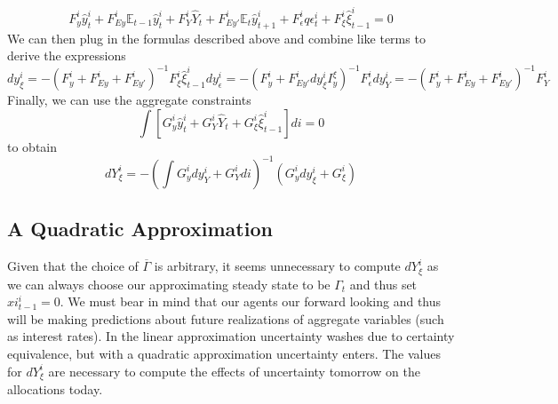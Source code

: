 \documentclass[thmsb,11pt]{article}
\newcommand{\EE}{\mathbb E}
\begin{document}
\[
	F^i_y\hat y^i_t + F^i_{Ey}\EE_{t-1}\hat y^i_{t} + F^i_Y \hat Y_t + F^i_{Ey'} \EE_t\hat y^i_{t+1} + F^i_\epsilon q\epsilon^i_t + F^i_\xi \hat \xi^i_{t-1} = 0
\]We can then plug in the formulas described above and combine like terms to derive the expressions
\begin{subequations}
\begin{equation}
	dy^i_\xi = -(F^i_y + F^i_{Ey} + F^i_{Ey'})^{-1}F^i_\xi \hat\xi^i_{t-1}
\end{equation}
\begin{equation}
	dy^i_\epsilon = -(F^i_y + F^i_{Ey'} dy^i_\xi I^\xi_y)^{-1} F^i_\epsilon 
\end{equation}
\begin{equation}
	dy^i_Y = -(F^i_y + F^i_{Ey} + F^i_{Ey'})^{-1} F^i_Y
\end{equation}
\end{subequations}Finally, we can use the aggregate constraints
\[
	\int\left[ G^i_y \hat y^i_t + G^i_Y \hat Y_t+ G^i_\xi \hat \xi^i_{t-1}\right]di = 0
\]to obtain
\begin{equation}
	dY^i_\xi =- \left(\int G^i_y dy^i_Y + G^i_Ydi\right)^{-1}\left(G^i_y dy^i_\xi + G^i_\xi\right)
\end{equation}
\subsection{A Quadratic Approximation}
Given that the choice of $\overline \Gamma$ is arbitrary, it seems unnecessary to compute $dY^i_\xi$ as we can always choose our approximating steady state to be $\Gamma_t$ and thus set $\hat xi^i_{t-1} =0$.  We must bear in mind that our agents our forward looking and thus will be making predictions about future realizations of aggregate variables (such as interest rates).  In the linear approximation uncertainty washes due to certainty equivalence, but with a quadratic approximation uncertainty enters.  The values for $dY^i_\xi$ are necessary to compute the effects of uncertainty tomorrow on the allocations today.
\end{document}
